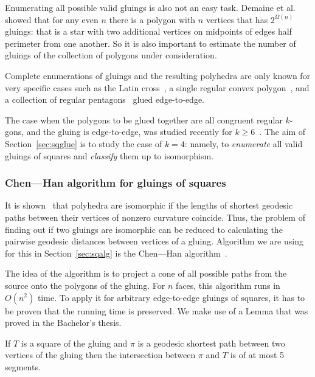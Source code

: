 \documentclass[a4paper,11pt]{article}
\begin{document}
Enumerating all possible valid gluings is also not an easy task. Demaine et al.~\cite{DDLO02} showed that for any even $n$ there is a polygon with $n$ vertices that has $2^{\Omega (n)}$ gluings: that is a star with two additional vertices on midpoints of edges half perimeter from one another. So it is also important to estimate the number of gluings of the collection of polygons under consideration.

Complete enumerations of gluings and the resulting polyhedra are only known for very specific cases such as the Latin cross~\cite{ddlop99}, a single regular convex polygon~\cite{DO07}, and a collection of regular pentagons~\cite{alz-penta-jip,alz-penta-jcdcggg} glued edge-to-edge.

The case when the polygons to be glued together are all congruent regular $k$-gons, and the gluing is edge-to-edge, was studied recently for $k \ge 6$~\cite{kl17-hex}. The aim of Section~\ref{sec:sqglue} is to study the case of $k=4$: namely, to {\it enumerate} all valid gluings of squares and {\it classify} them up to isomorphism.

\subsubsection{Chen—Han algorithm for gluings of squares}

It is shown~\cite{DO07} that polyhedra are isomorphic if the lengths of shortest geodesic paths between their vertices of nonzero curvature coincide. Thus, the problem of finding out if two gluings are isomorphic can be reduced to calculating the pairwise geodesic distances between vertices of a gluing. Algorithm we are using for this in Section~\ref{sec:sqalg} is the Chen—Han algorithm~\cite{chen-han}.

The idea of the algorithm is to project a cone of all possible paths from the source onto the polygons of the gluing. For $n$ faces, this algorithm runs in $O(n^2)$ time. To apply it for arbitrary edge-to-edge gluings of squares, it has to be proven that the running time is preserved. We make use of a Lemma that was proved in the Bachelor's thesis.

\begin{lemma} \label{lm:shortestSquare}
	If $T$ is a square of the gluing and $\pi$ is a geodesic shortest path between two vertices of the gluing then the intersection between $\pi$ and $T$ is of at most 5 segments.
\end{lemma}
\end{document}

